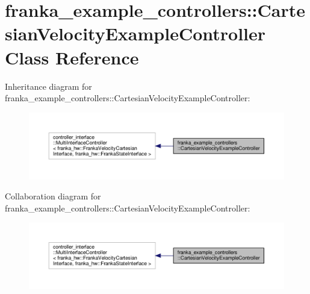 \hypertarget{classfranka__example__controllers_1_1_cartesian_velocity_example_controller}{}\section{franka\+\_\+example\+\_\+controllers\+:\+:Cartesian\+Velocity\+Example\+Controller Class Reference}
\label{classfranka__example__controllers_1_1_cartesian_velocity_example_controller}


Inheritance diagram for franka\+\_\+example\+\_\+controllers\+:\+:Cartesian\+Velocity\+Example\+Controller\+:
\nopagebreak
\begin{figure}[H]
\begin{center}
\leavevmode
\includegraphics[width=350pt]{classfranka__example__controllers_1_1_cartesian_velocity_example_controller__inherit__graph}
\end{center}
\end{figure}


Collaboration diagram for franka\+\_\+example\+\_\+controllers\+:\+:Cartesian\+Velocity\+Example\+Controller\+:
\nopagebreak
\begin{figure}[H]
\begin{center}
\leavevmode
\includegraphics[width=350pt]{classfranka__example__controllers_1_1_cartesian_velocity_example_controller__coll__graph}
\end{center}
\end{figure}
